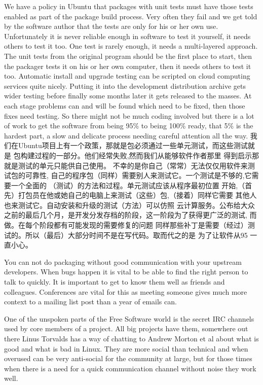 We have a policy in Ubuntu that packages with unit tests must have those tests
enabled as part of the package build process. Very often they fail and we get
told by the software author that the tests are only for his or her own use.
Unfortunately it is never reliable enough in software to test it yourself, it
needs others to test it too. One test is rarely enough, it needs a multi-layered
approach. The unit tests from the original program should be the first place to
start, then the packager tests it on his or her own computer, then it needs
others to test it too. Automatic install and upgrade testing can be scripted on
cloud computing services quite nicely. Putting it into the development
distribution archive gets wider testing before finally some months later it gets
released to the masses. At each stage problems can and will be found which need
to be fixed, then those fixes need testing. So there might not be much coding
involved but there is a lot of work to get the software from being 95\% to being
100\% ready, that 5\% is the hardest part, a slow and delicate process needing
careful attention all the way.
我们在Ubuntu项目上有一个政策，那就是包必须通过一些单元测试，而这些测试就是
包构建过程的一部分。他们经常失败,然而我们从能够软件作者那里
得到启示那就是测试的单元只能供自己使用。
不幸的是你自己（常常）无法仅仅用软件来测试包的可靠性,
自己的程序包（同样）需要别人来测试它。一个测试是不够的,它需要一个全面的
（测试）的方法和过程。单元测试应该从程序最初位置
开始,（首先）打包员在他或她自己的电脑上来测试（这些）包,（接着）同样它需要
其他人也来测试它。自动安装和升级的测试（方法）可以仿照
云计算服务。公布给大众之前的最后几个月，是开发分发存档的阶段，这一阶段为了获得更广泛的测试,
而做。在每个阶段都有可能发现的需要修复的问题
同样那些补丁是需要（经过）测试的。所以（最后）大部分时间不是在写代码。取而代之的是
为了让软件从95%
一直小心。

You can not do packaging without good communication with your upstream
developers. When bugs happen it is vital to be able to find the right person to
talk to quickly. It is important to get to know them well as friends and
colleagues. Conferences are vital for this as meeting someone gives much more
context to a mailing list post than a year of emails can. 

One of the unspoken parts of the Free Software world is the secret IRC channels
used by core members of a project. All big projects have them, somewhere out
there Linus Torvalds has a way of chatting to Andrew Morton et al about what is
good and what is bad in Linux. They are more social than technical and when
overused can be very anti-social for the community at large, but for those times
when there is a need for a quick communication channel without noise they work
well.


